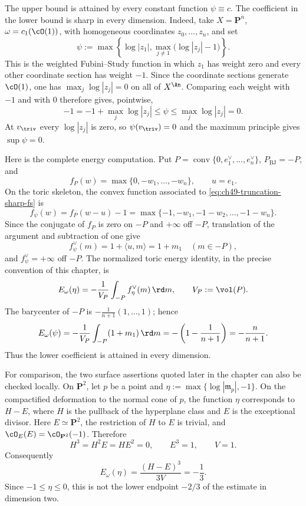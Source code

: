 \begin{remark}
\label{rem:ch49-truncation-sharp}
The upper bound is attained by every constant function \(\psi\equiv c\).
The coefficient in the lower bound is sharp in every dimension.  Indeed,
take \(X=\mathbf P^n\), \(\omega=c_1(\cO(1))\), with homogeneous
coordinates \(z_0,\ldots,z_n\), and set
\[
 \psi:=\max\!\left\{\log|z_1|,
              \max_{j\ne1}\bigl(\log|z_j|-1\bigr)\right\}.
\tag{49.6e}\label{eq:ch49-truncation-sharp-fs}
\]
This is the weighted Fubini--Study function in which \(z_1\) has weight
zero and every other coordinate section has weight \(-1\).  Since the
coordinate sections generate \(\cO(1)\), one has
\(\max_j\log|z_j|=0\) on all of \(X^{\An}\).  Comparing each weight with
\(-1\) and with \(0\) therefore gives, pointwise,
\[
 -1=-1+\max_j\log|z_j|\le\psi
 \le\max_j\log|z_j|=0.
\]
At \(v_{\triv}\) every \(\log|z_j|\) is zero, so \(\psi(v_{\triv})=0\)
and the maximum principle gives \(\sup\psi=0\).

Here is the complete energy computation.  Put
\(P=\operatorname{conv}\{0,e_1^\vee,\ldots,e_n^\vee\}\),
\(P_{\mathrm{BJ}}=-P\), and
\[
 f_P(w)=\max\{0,-w_1,\ldots,-w_n\},\qquad u=e_1.
\]
On the toric skeleton, the convex function associated to
\eqref{eq:ch49-truncation-sharp-fs} is
\[
 f_\psi(w)=f_P(w-u)-1
 =\max\{-1,-w_1,-1-w_2,\ldots,-1-w_n\}.
\]
Since the conjugate of \(f_P\) is zero on \(-P\) and \(+\infty\)
off \(-P\), translation of the argument and subtraction of one give
\[
 f_\psi^\vee(m)=1+\langle u,m\rangle=1+m_1
 \quad(m\in-P),
\]
and \(f_\psi^\vee=+\infty\) off \(-P\).  The normalized toric energy
identity, in the precise convention of this chapter, is
\[
 E_\omega(\eta)=-\frac1{V_P}\int_{-P}f_\eta^\vee(m)\,\rd m,
 \qquad V_P:=\vol(P).
\]
The barycenter of \(-P\) is
\(-\frac1{n+1}(1,\ldots,1)\); hence
\[
 E_\omega(\psi)
 =-\frac1{V_P}\int_{-P}(1+m_1)\,\rd m
 =-\left(1-\frac1{n+1}\right)
 =-\frac n{n+1}.
\]
Thus the lower coefficient is attained in every dimension.

For comparison, the two surface assertions quoted later in the chapter
can also be checked locally.  On \(\mathbf P^2\), let \(p\) be a point
and
\(\eta:=\max\{\log|\mathfrak m_p|,-1\}\).  On the compactified
deformation to the normal cone of \(p\), the function \(\eta\) corresponds
to \(H-E\), where \(H\) is the pullback of the hyperplane class and \(E\)
is the exceptional divisor.  Here \(E\simeq\mathbf P^2\), the restriction
of \(H\) to \(E\) is trivial, and
\(\cO_E(E)=\cO_{\mathbf P^2}(-1)\).  Therefore
\[
 H^3=H^2E=HE^2=0,\qquad E^3=1,\qquad V=1.
\]
Consequently
\[
 E_\omega(\eta)=\frac{(H-E)^3}{3V}=-\frac13.
\]
Since \(-1\le\eta\le0\), this is not the lower endpoint \(-2/3\) of the
estimate in dimension two.


\end{remark}
